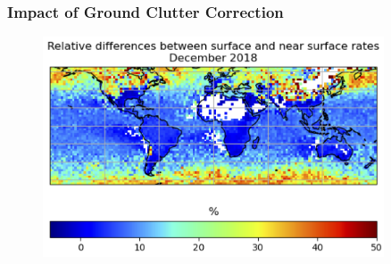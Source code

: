 \documentclass{beamer}
\begin{document}
\begin{frame}
\begin{columns}
\begin{column}{0.5\textwidth}
\begin{figure}
\begin{center}
        \end{center}
    \end{figure}
\end{column}
\end{columns}
\end{frame}
\begin{frame}
\frametitle{Impact of Ground Clutter Correction}
\begin{figure}
        \begin{center}
        \includegraphics[width=0.9\textwidth]{Figures/fig11.png}
        \end{center}
    \end{figure}
\end{frame}
\end{document}
